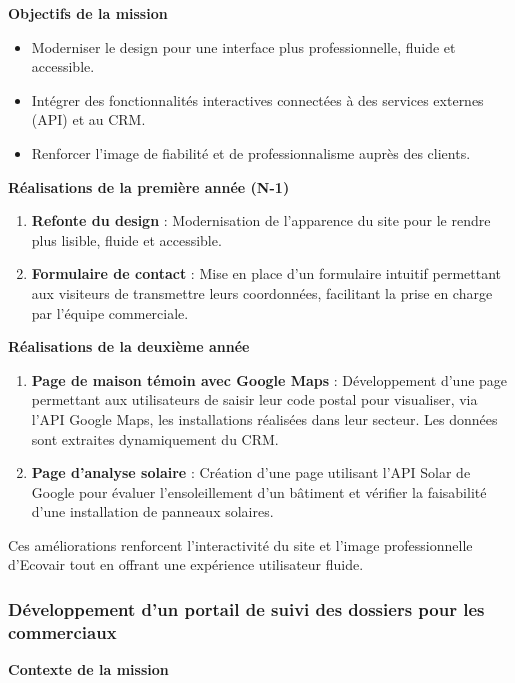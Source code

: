 \textbf{Objectifs de la mission}

\begin{itemize}
    \item Moderniser le design pour une interface plus professionnelle, fluide et accessible.
    \item Intégrer des fonctionnalités interactives connectées à des services externes (API) et au CRM.
    \item Renforcer l’image de fiabilité et de professionnalisme auprès des clients.
\end{itemize}

\textbf{Réalisations de la première année (N-1)}

\begin{enumerate}
    \item \textbf{Refonte du design} : Modernisation de l’apparence du site pour le rendre plus lisible, fluide et accessible.
    \item \textbf{Formulaire de contact} : Mise en place d’un formulaire intuitif permettant aux visiteurs de transmettre leurs coordonnées, facilitant la prise en charge par l’équipe commerciale.
\end{enumerate}

\textbf{Réalisations de la deuxième année}

\begin{enumerate}
    \item \textbf{Page de maison témoin avec Google Maps} : Développement d’une page permettant aux utilisateurs de saisir leur code postal pour visualiser, via l’API Google Maps, les installations réalisées dans leur secteur. Les données sont extraites dynamiquement du CRM.
    \item \textbf{Page d’analyse solaire} : Création d’une page utilisant l’API Solar de Google pour évaluer l’ensoleillement d’un bâtiment et vérifier la faisabilité d’une installation de panneaux solaires.
\end{enumerate}

Ces améliorations renforcent l’interactivité du site et l’image professionnelle d’Ecovair tout en offrant une expérience utilisateur fluide.

\subsubsection{Développement d’un portail de suivi des dossiers pour les commerciaux}

\textbf{Contexte de la mission}

